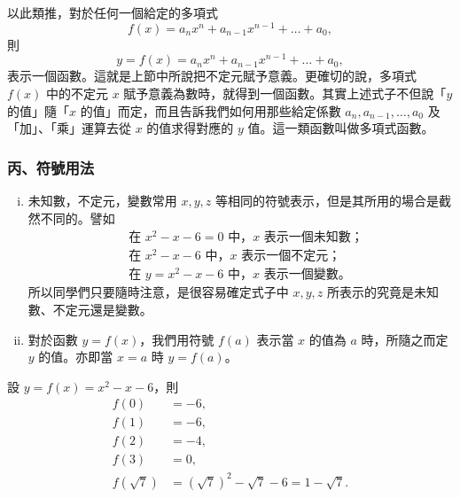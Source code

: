 以此類推，對於任何一個給定的多項式
\begin{equation*}
  f(x) = a_n x^n + a_{n-1} x^{n-1} + \dots + a_0,
\end{equation*}
則
\begin{equation*}
  y = f(x) = a_n x^n + a_{n-1} x^{n-1} + \dots + a_0,
\end{equation*}
表示一個函數。這就是上節中所說把不定元賦予意義。更確切的說，多項式 $f(x)$ 中的不定元 $x$ 賦予意義為數時，就得到一個函數。其實上述式子不但說「$y$ 的值」隨「$x$ 的值」而定，而且告訴我們如何用那些給定係數 $a_n, a_{n-1}, \dots, a_0$ 及「加」、「乘」運算去從 $x$ 的值求得對應的 $y$ 值。這一類函數叫做多項式函數。

\subsubsection*{丙、符號用法}\label{subsec:5-3-c}

\begin{enumerate}[(i)]
  \item 未知數，不定元，變數常用 $x, y, z$ 等相同的符號表示，但是其所用的場合是截然不同的。譬如
  \begin{align*}
    &\text{在 } x^2-x-6=0 \text{ 中，$x$ 表示一個未知數；} \\
    &\text{在 } x^2-x-6 \text{ 中，$x$ 表示一個不定元；} \\
    &\text{在 } y=x^2-x-6 \text{ 中，$x$ 表示一個變數。}
  \end{align*}
  所以同學們只要隨時注意，是很容易確定式子中 $x, y, z$ 所表示的究竟是未知數、不定元還是變數。

  \item 對於函數 $y=f(x)$，我們用符號 $f(a)$ 表示當 $x$ 的值為 $a$ 時，所隨之而定 $y$ 的值。亦即當 $x=a$ 時 $y=f(a)$。
\end{enumerate}

\begin{example}\label{ex:5-3-7}
設 $y=f(x)=x^2-x-6$，則
\begin{align*}
  f(0) &= -6, \\
  f(1) &= -6, \\
  f(2) &= -4, \\
  f(3) &= 0, \\
  f(\sqrt{7}) &= (\sqrt{7})^2 - \sqrt{7} - 6 = 1 - \sqrt{7}.
\end{align*}
\end{example}

